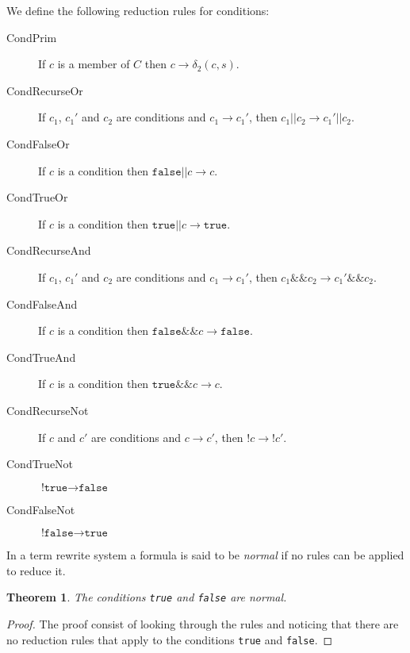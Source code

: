 \documentclass[11pt]{article}
\begin{document}
We define the following reduction rules for conditions:

\begin{description}

\item[CondPrim] If $c$ is a member of $C$ then $c \rightarrow \delta_{2}(c, s)$.

\item[CondRecurseOr] If $c_{1}$, $c_{1}'$ and $c_{2}$ are conditions and $c_{1} \rightarrow c_{1}'$, then
$c_{1}\texttt{||}c_{2} \rightarrow c_{1}'\texttt{||}c_{2}$.
\item[CondFalseOr] If $c$ is a condition then $\texttt{false||} c \rightarrow c$.
\item[CondTrueOr] If $c$ is a condition then $\texttt{true||} c \rightarrow \texttt{true}$.

\item[CondRecurseAnd] If $c_{1}$, $c_{1}'$ and $c_{2}$ are conditions and $c_{1} \rightarrow c_{1}'$, then
$c_{1}\texttt{\&\&}c_{2} \rightarrow c_{1}'\texttt{\&\&}c_{2}$.
\item[CondFalseAnd] If $c$ is a condition then $\texttt{false\&\&} c \rightarrow \texttt{false}$.
\item[CondTrueAnd] If $c$ is a condition then $\texttt{true\&\&} c \rightarrow c$.

\item[CondRecurseNot] If $c$ and $c'$ are conditions and $c \rightarrow c'$, then
$\texttt{!}c \rightarrow \texttt{!}c'$.
\item[CondTrueNot] $\texttt{!true} \rightarrow \texttt{false}$
\item[CondFalseNot] $\texttt{!false} \rightarrow \texttt{true}$

\end{description}

In a term rewrite system a formula is said to be \emph{normal} if no rules can be applied to reduce it.

\newtheorem*{truefalsearenormal}{Theorem}
\begin{truefalsearenormal}
The conditions \texttt{true} and \texttt{false} are normal.
\end{truefalsearenormal}

\begin{proof}
The proof consist of looking through the rules and noticing that there are no reduction rules that apply to the conditions \texttt{true} and \texttt{false}.
\end{proof}
\end{document}
